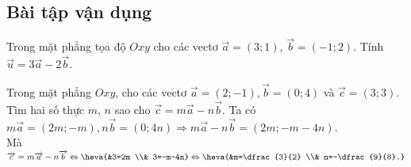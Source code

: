 \subsection{Bài tập vận dụng}
\begin{bt}%
	Trong mặt phẳng tọa độ $Oxy$ cho các vectơ $\vec{a}=(3;1)$, $\vec{b}=(-1;2)$. Tính $\vec{u}=3\vec{a}-2\vec{b}$.
\end{bt}

\begin{bt}%
	Trong mặt phẳng $Oxy$, cho các vectơ $\overrightarrow{a}=(2;-1),\overrightarrow{b}=(0;4)$ và $\overrightarrow{c}=(3;3)$. Tìm hai số thực $m$, $n$ sao cho $\overrightarrow{c}=m\overrightarrow{a}-n\overrightarrow{b}$.
	\loigiai
	{
		Ta có $m\overrightarrow{a}=(2m;-m),n\overrightarrow{b}=(0;4n) \Rightarrow m\overrightarrow{a}-n\overrightarrow{b}=(2m;-m-4n)$.\\
		Mà $\overrightarrow{c}=m\overrightarrow{a}-n\overrightarrow{b} \Leftrightarrow \heva{&3=2m \\& 3=-m-4n}\Leftrightarrow \heva{&m=\dfrac{3}{2} \\& n=-\dfrac{9}{8}.}$
	}
\end{bt}


